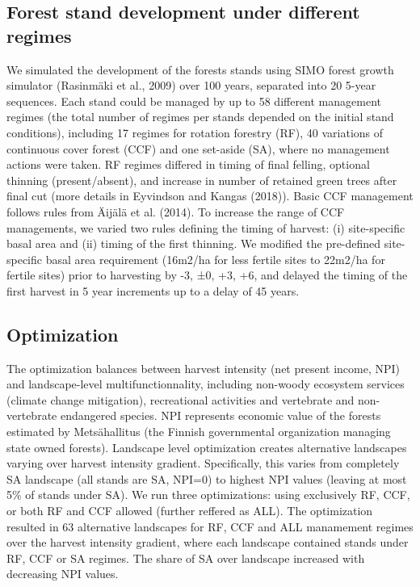 \documentclass[]{elsarticle} %
\begin{document}
\hypertarget{forest-stand-development-under-different-regimes}{%
\subsection{Forest stand development under different regimes}\label{forest-stand-development-under-different-regimes}}

We simulated the development of the forests stands using SIMO forest growth simulator (Rasinmäki et al., 2009) over 100 years, separated into 20 5-year sequences. Each stand could be managed by up to 58 different management regimes (the total number of regimes per stands depended on the initial stand conditions), including 17 regimes for rotation forestry (RF), 40 variations of continuous cover forest (CCF) and one set-aside (SA), where no management actions were taken. RF regimes differed in timing of final felling, optional thinning (present/absent), and increase in number of retained green trees after final cut (more details in Eyvindson and Kangas (2018)). Basic CCF management follows rules from Äijälä et al. (2014). To increase the range of CCF managements, we varied two rules defining the timing of harvest: (i) site-specific basal area and (ii) timing of the first thinning. We modified the pre-defined site-specific basal area requirement (16m2/ha for less fertile sites to 22m2/ha for fertile sites) prior to harvesting by -3, ±0, +3, +6, and delayed the timing of the first harvest in 5 year increments up to a delay of 45 years.

\hypertarget{optimization}{%
\subsection{Optimization}\label{optimization}}

The optimization balances between harvest intensity (net present income, NPI) and landscape-level multifunctionnality, including non-woody ecosystem services (climate change mitigation), recreational activities and vertebrate and non-vertebrate endangered species. NPI represents economic value of the forests estimated by Metsähallitus (the Finnish governmental organization managing state owned forests). Landscape level optimization creates alternative landscapes varying over harvest intensity gradient. Specifically, this varies from completely SA landscape (all stands are SA, NPI=0) to highest NPI values (leaving at most 5\% of stands under SA). We run three optimizations: using exclusively RF, CCF, or both RF and CCF allowed (further reffered as ALL).
The optimization resulted in 63 alternative landscapes for RF, CCF and ALL manamement regimes over the harvest intensity gradient, where each landscape contained stands under RF, CCF or SA regimes. The share of SA over landscape increased with decreasing NPI values.
\end{document}
